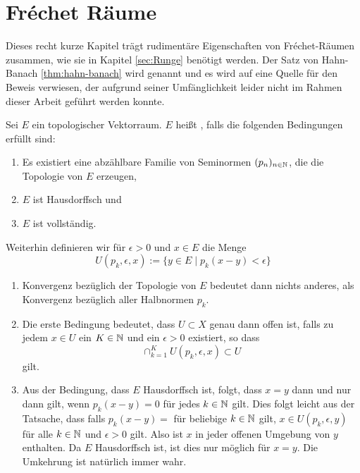 
\section{Fr\'echet Räume}
\label{sec:frechet}

Dieses recht kurze Kapitel trägt rudimentäre Eigenschaften von
Fr\'echet-Räumen zusammen, wie sie in Kapitel \ref{sec:Runge} benötigt
werden. Der Satz von Hahn-Banach \ref{thm:hahn-banach} wird genannt
und es wird auf eine Quelle für den Beweis verwiesen, der aufgrund
seiner Umfänglichkeit leider nicht im Rahmen dieser Arbeit geführt
werden konnte.

\begin{defin}
  \label{def:frechet}
  Sei $E$ ein topologischer Vektorraum. $E$ heißt
  , falls die folgenden Bedingungen erfüllt sind:
  \begin{enumerate}
  \item Es existiert eine abzählbare Familie von Seminormen $(p_n)_{n
      \in \mathbb{N}}$, die die Topologie von $E$ erzeugen,
  \item $E$ ist Hausdorffsch und
  \item $E$ ist vollständig.
  \end{enumerate}
  Weiterhin definieren wir für $\epsilon > 0$ und $x \in E$ die Menge
  \[
  U(p_k, \epsilon, x) := \{ y \in E \mid p_k(x-y) < \epsilon\}
  \]
\end{defin}


\begin{rem}
  \label{rem:frechet}
  \begin{enumerate}
  \item Konvergenz bezüglich der Topologie von $E$ bedeutet dann
    nichts anderes, als Konvergenz bezüglich aller Halbnormen $p_k$.
  \item Die erste Bedingung bedeutet, dass $U\subset X$ genau dann
    offen ist, falls zu jedem $x \in U$ ein $K \in \mathbb{N}$ und ein
    $\epsilon > 0$ existiert, so dass
    \[
    \cap_{k=1}^K U(p_k, \epsilon, x) \subset U
    \]
    gilt.
  \item Aus der Bedingung, dass $E$ Hausdorffsch ist, folgt, dass $x =
    y$ dann und nur dann gilt, wenn $p_k(x-y) = 0$ für jedes $k \in
    \mathbb{N}$ gilt. Dies folgt leicht aus der Tatsache, dass falls $p_k(x-y)
    = $ für beliebige $k \in \mathbb{N}$ gilt, $x \in U(p_k, \epsilon, y)$ für
    alle $k \in \mathbb{N}$ und $\epsilon > 0$ gilt. Also ist $x$ in jeder
    offenen Umgebung von $y$ enthalten. Da $E$ Hausdorffsch ist, ist
    dies nur möglich für $x = y$. Die Umkehrung ist natürlich immer wahr.
  \end{enumerate}
\end{rem}

